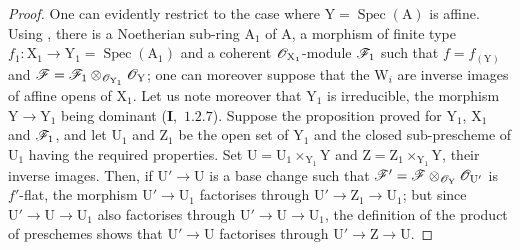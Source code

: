 \begin{proof}
One can evidently restrict to the case where $\mathrm{Y}=\operatorname{Spec}(\mathrm{A})$ is affine. Using
, there is a Noetherian sub-ring $\mathrm{A}_1$ of $\mathrm{A}$, a morphism of finite type
$f_1:\mathrm{X}_1\to\mathrm{Y}_1=\operatorname{Spec}(\mathrm{A}_1)$ and a coherent $\mathscr{O}_{\mathrm{X}_1}$-module $\mathscr{F}_1$ such that $f=f_{(\mathrm{Y})}$ and $\mathscr{F}=\mathscr{F}_1\otimes_{\mathscr{O}_{\mathrm{Y}_1}}\mathscr{O}_\mathrm{Y}$;
one can moreover suppose that the $\mathrm{W}_i$ are inverse images of affine opens of $\mathrm{X}_1$.
Let us note moreover that $\mathrm{Y}_1$ is irreducible, the morphism $\mathrm{Y}\to\mathrm{Y}_1$ being dominant (\textbf{I},~$1.2.7$).
Suppose the proposition proved for $\mathrm{Y}_1$, $\mathrm{X}_1$ and $\mathscr{F}_1$, and let $\mathrm{U}_1$ and $\mathrm{Z}_1$ be the open set of $\mathrm{Y}_1$
and the closed sub-prescheme of $\mathrm{U}_1$ having the required properties. Set $\mathrm{U}=\mathrm{U}_1\times_{\mathrm{Y}_1}\mathrm{Y}$ and $\mathrm{Z}=\mathrm{Z}_1\times_{\mathrm{Y}_1}\mathrm{Y}$, their inverse images. Then, if $\mathrm{U}'\to\mathrm{U}$ is a base change
such that $\mathscr{F}'=\mathscr{F}\otimes_{\mathscr{O}_\mathrm{Y}}\mathscr{O}_{\mathrm{U}'}$ is $f'$-flat, the morphism $\mathrm{U}'\to\mathrm{U}_1$ factorises
through $\mathrm{U}'\to\mathrm{Z}_1\to\mathrm{U}_1$; but since $\mathrm{U}'\to\mathrm{U}\to\mathrm{U}_1$ also factorises through $\mathrm{U}'\to\mathrm{U}\to\mathrm{U}_1$, the definition
of the product of preschemes shows that $\mathrm{U}'\to\mathrm{U}$ factorises through $\mathrm{U}'\to\mathrm{Z}\to\mathrm{U}$.


\end{proof}
